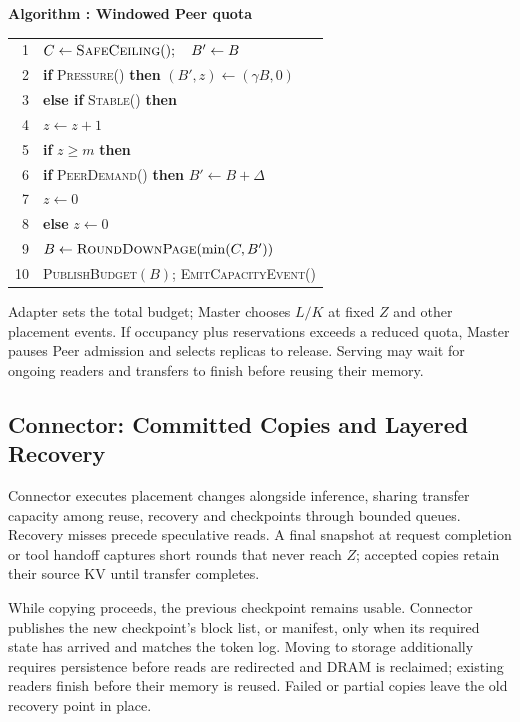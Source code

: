 \par\medskip\noindent\begin{minipage}{\columnwidth}
\raggedright
 \label{alg:adapter}
 \textbf{Algorithm \thedesignalgorithm: Windowed Peer quota}
 \par\smallskip
 \begin{tabularx}{\columnwidth}{@{}r@{\quad}X@{}}
 \toprule
 1 & $C\gets\textsc{SafeCeiling}();\quad B'\gets B$ \\
 2 & \textbf{if} \textsc{Pressure}() \textbf{then} $(B',z)\gets(\gamma B,0)$ \\
 3 & \textbf{else if} \textsc{Stable}() \textbf{then} \\
 4 & \quad $z\gets z+1$ \\
 5 & \quad \textbf{if} $z\ge m$ \textbf{then} \\
 6 & \qquad \textbf{if} \textsc{PeerDemand}() \textbf{then} $B'\gets B+\Delta$ \\
 7 & \qquad $z\gets0$ \\
 8 & \textbf{else} $z\gets0$ \\
 9 & $B\gets\textsc{RoundDownPage}(\min(C,B'))$ \\
 10 & \textsc{PublishBudget}$(B)$; \textsc{EmitCapacityEvent}() \\
 \bottomrule
 \end{tabularx}
\end{minipage}\par\medskip

Adapter sets the total budget; Master chooses $L/K$ at fixed $Z$ and
other placement events. If occupancy plus reservations exceeds a reduced
quota, Master pauses Peer admission and selects replicas to release.
Serving may wait for ongoing readers and transfers to finish before
reusing their memory.

\subsection{Connector: Committed Copies and Layered Recovery}
\label{sec:connector}

Connector executes placement changes alongside inference, sharing transfer
capacity among reuse, recovery and checkpoints through bounded queues.
Recovery misses precede speculative reads. A final snapshot at request
completion or tool handoff captures short rounds that never reach $Z$;
accepted copies retain their source KV until transfer completes.

While copying proceeds, the previous checkpoint remains usable.
Connector publishes the new checkpoint's block list, or manifest, only
when its required state has arrived and matches the token log. Moving
to storage additionally requires persistence before reads are redirected
and DRAM is reclaimed; existing readers finish before their memory is
reused. Failed or partial copies leave the old recovery point in place.

